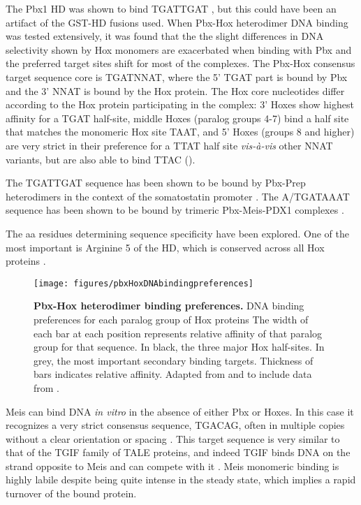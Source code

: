 The Pbx1 \ac{HD} was shown to bind TGATTGAT \parencite{VanDijk1993}, but this could have been an artifact of the GST-\ac{HD} fusions used. When Pbx-Hox heterodimer DNA binding was tested extensively, it was found that the the slight differences in DNA selectivity shown by Hox monomers are exacerbated when binding with Pbx and the preferred target sites shift for most of the complexes. The Pbx-Hox consensus target sequence core is TGATNNAT, where the 5' TGAT part is bound by Pbx and the 3' NNAT is bound by the Hox protein. The Hox core nucleotides differ according to the Hox protein participating in the complex: 3' Hoxes show highest affinity for a TGAT half-site, middle Hoxes (paralog groups 4-7) bind a half site that matches the monomeric Hox site TAAT, and 5' Hoxes (groups 8 and higher) are very strict in their preference for a TTAT half site \textit{vis-à-vis} other NNAT variants, but are also able to bind TTAC (\cite{Chang1996, Chan1997, Shen1997a}). %

The TGATTGAT sequence has been shown to be bound by Pbx-Prep heterodimers in the context of the somatostatin promoter \parencite{Goudet1999}. The A/TGATAAAT sequence has been shown to be bound by trimeric Pbx-Meis-PDX1 complexes \parencite{Liu2001}.

The \ac{aa} residues determining sequence specificity have been explored. One of the most important is Arginine 5 of the \ac{HD}, which is conserved across all Hox proteins \parencite{Phelan1997}. %


\begin{figure}[]
  
  \centering
  \texttt{[image: figures/pbxHoxDNAbindingpreferences]}
  \caption[Pbx-Hox heterodimer binding preferences]{\textbf{Pbx-Hox heterodimer binding preferences.} DNA binding preferences for each paralog group of Hox proteins The width of each bar at each position represents relative affinity of that paralog group for that sequence. In black, the three major Hox half-sites. In grey, the most important secondary binding targets. Thickness of bars indicates relative affinity. Adapted from \textcite{Shen1997a} and \textcite{Shen1997} to include data from \textcite{Slattery2011}.}
  \label{fig:PbxHoxBinding}
\end{figure}

Meis can bind DNA \textit{in vitro} in the absence of either Pbx or Hoxes. In this case it recognizes a very strict consensus sequence, TGACAG, often in multiple copies without a clear orientation or spacing \parencite{Shen1997}. This target sequence is very similar to that of the TGIF family of TALE proteins, and indeed TGIF binds DNA on the strand opposite to Meis and can compete with it \parencite{Yang2000}. Meis monomeric binding is highly labile despite being quite intense in the steady state, which implies a rapid turnover of the bound protein. 

